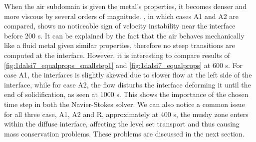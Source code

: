 When the air subdomain is given the metal's properties, it becomes denser and more viscous by several orders of magnitude. 
, in which cases A1 and A2 are compared, shows no noticeable sign of velocity instability near the interface before 200 s.
It can be explained by the fact that the air behaves mechanically like a fluid metal given similar properties, 
therefore no steep transitions are computed at the interface. 
However, it is interesting to compare results of \cref{fig:1dalsi7_equalprops_smallstep1} and \cref{fig:1dalsi7_equalprops} at 600 s.
For case A1, the interfaces is slightly skewed due to slower flow at the left side of the interface, while for case A2, the flow disturbs
the interface deforming it until the end of solidification, as seen at 1000 s. This shows the importance of the chosen time step
in both the Navier-Stokes solver. 
We can also notice a common issue for all three case, A1, A2 and R, approximately at 400 s, the mushy zone enters within the diffuse interface, 
affecting the level set transport and thus causing mass conservation problems. These problems are discussed in the next section.

